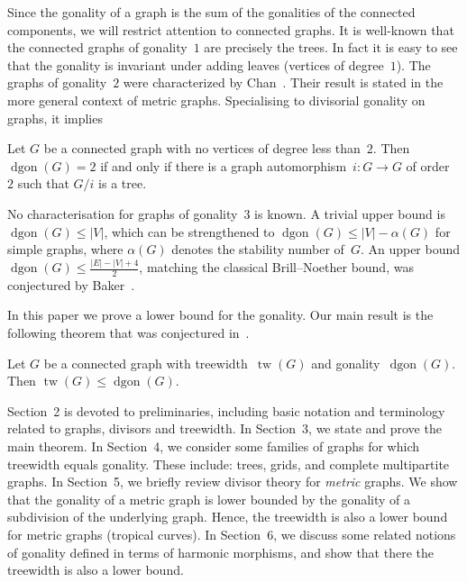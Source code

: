 \documentclass[ALCO,ThmDefs,Unicode,epreuves]{cedram}
\DeclareMathOperator{\tw}{tw}
\DeclareMathOperator{\dgon}{dgon}
\begin{document}
Since the gonality of a graph is the sum of the gonalities of the connected components, we will restrict attention to connected graphs. It is well-known that the connected graphs of gonality~$1$ are precisely the trees. In fact it is easy to see that the gonality is invariant under adding leaves (vertices of degree~$1$). The graphs of gonality~$2$ were characterized by Chan~\cite{Chan}. Their result is stated in the more general context of metric graphs. Specialising to divisorial gonality on graphs, it implies
\begin{theo*}
Let $G$ be a connected graph with no vertices of degree less than~$2$. Then $\dgon(G)=2$ if and only if there is a graph automorphism~$i:G\to G$ of order~$2$ such that $G/i$ is a tree. 
\end{theo*}
No characterisation for graphs of gonality~$3$ is known. A trivial upper bound is $\dgon(G)\leq |V|$, which can be strengthened to $\dgon(G)\leq |V|-\alpha(G)$ for simple graphs, where $\alpha(G)$ denotes the stability number of~$G$. An upper bound $\dgon(G)\leq \frac{|E|-|V|+4}{2}$, matching the classical Brill--Noether bound, was conjectured by Baker~\cite[Conjecture~3.10]{Baker2008}.

In this paper we prove a lower bound for the gonality. Our main result is the following theorem that was conjectured in~\cite{vanDobbendeBruyn2012}. 

\begin{theorem} Let $G$ be a connected graph with treewidth~$\tw(G)$ and gonality~$\dgon(G)$. Then $\tw(G)\leq \dgon(G)$. 
\end{theorem}

Section~2 is devoted to preliminaries, including basic notation and terminology related to graphs, divisors and treewidth. In Section~3, we state and prove the main theorem. In Section~4, we consider some families of graphs for which treewidth equals gonality. These include: trees, grids, and complete multipartite graphs. In Section~5, we briefly review divisor theory for \emph{metric} graphs. We show that the gonality of a metric graph is lower bounded by the gonality of a subdivision of the underlying graph. Hence, the treewidth is also a lower bound for metric graphs (tropical curves). In Section~6, we discuss some related notions of gonality defined in terms of harmonic morphisms, and show that there the treewidth is also a lower bound.
\end{document}
